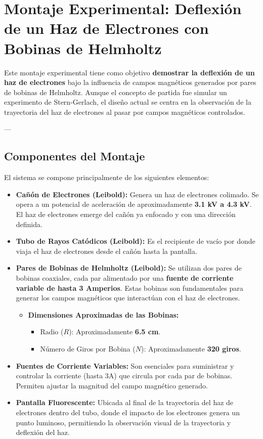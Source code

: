 \section{Montaje Experimental: Deflexión de un Haz de Electrones con Bobinas de Helmholtz}
Este montaje experimental tiene como objetivo \textbf{demostrar la deflexión de un haz de electrones} bajo la influencia de campos magnéticos generados por pares de bobinas de Helmholtz. Aunque el concepto de partida fue simular un experimento de Stern-Gerlach, el diseño actual se centra en la observación de la trayectoria del haz de electrones al pasar por campos magnéticos controlados.

---

\subsection{Componentes del Montaje}
El sistema se compone principalmente de los siguientes elementos:
\begin{itemize}
    \item \textbf{Cañón de Electrones (Leibold):} Genera un haz de electrones colimado. Se opera a un potencial de aceleración de aproximadamente \textbf{3.1 kV a 4.3 kV}. El haz de electrones emerge del cañón ya enfocado y con una dirección definida.
    \item \textbf{Tubo de Rayos Catódicos (Leibold):} Es el recipiente de vacío por donde viaja el haz de electrones desde el cañón hasta la pantalla.
    \item \textbf{Pares de Bobinas de Helmholtz (Leibold):} Se utilizan dos pares de bobinas coaxiales, cada par alimentado por una \textbf{fuente de corriente variable de hasta 3 Amperios}. Estas bobinas son fundamentales para generar los campos magnéticos que interactúan con el haz de electrones.
    \begin{itemize}
        \item \textbf{Dimensiones Aproximadas de las Bobinas:}
        \begin{itemize}
            \item Radio ($R$): Aproximadamente \textbf{6.5 cm}.
            \item Número de Giros por Bobina ($N$): Aproximadamente \textbf{320 giros}.
        \end{itemize}
    \end{itemize}
    \item \textbf{Fuentes de Corriente Variables:} Son esenciales para suministrar y controlar la corriente (hasta 3A) que circula por cada par de bobinas. Permiten ajustar la magnitud del campo magnético generado.
    \item \textbf{Pantalla Fluorescente:} Ubicada al final de la trayectoria del haz de electrones dentro del tubo, donde el impacto de los electrones genera un punto luminoso, permitiendo la observación visual de la trayectoria y deflexión del haz.
\end{itemize}

